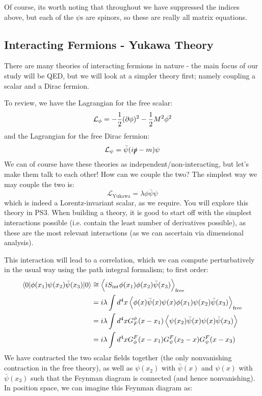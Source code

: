 Of course, its worth noting that throughout we have suppressed the indices above, but each of the $\psi$s are spinors, so these are really all matrix equations.

\subsection{Interacting Fermions - Yukawa Theory}
There are many theories of interacting fermions in nature - the main focus of our study will be QED, but we will look at a simpler theory first; namely coupling a scalar and a Dirac fermion.

To review, we have the Lagrangian for the free scalar:
\begin{equation}
    \mathcal{L}_\phi = -\frac{1}{2}(\partial\phi)^2 - \frac{1}{2}M^2\phi^2
\end{equation}
and the Lagrangian for the free Dirac fermion:
\begin{equation}
    \mathcal{L}_\psi = \bar{\psi}(i\slashed{p} - m)\psi
\end{equation}
We can of course have these theories as independent/non-interacting, but let's make them talk to each other! How can we couple the two? The simplest way we may couple the two is:
\begin{equation}
    \mathcal{L}_{\text{Yukawa}} = \lambda \phi \bar{\psi}\psi
\end{equation}
which is indeed a Lorentz-invariant scalar, as we require. You will explore this theory in PS3. When building a theory, it is good to start off with the simplest interactions possible (i.e. contain the least number of derivatives possible), as these are the most relevant interactions (as we can ascertain via dimensional analysis).

This interaction will lead to a correlation, which we can compute perturbatively in the usual way using the path integral formalism; to first order:
\begin{equation}
    \begin{split}
        \langle 0 \rvert\phi(x_1)\psi(x_2)\bar{\psi}(x_3)\lvert 0 \rangle &\cong \left< iS_{\text{int}}\phi(x_1)\phi(x_2)\bar{\psi}(x_3) \right>_{\text{free}}
        \\ &= i\lambda \int d^4x \left< \phi(x)\bar{\psi}(x)\psi(x) \phi(x_1)\psi(x_2)\bar{\psi}(x_3) \right>_{\text{free}}
        \\ &= i\lambda \int d^4x G_F^\phi(x - x_1)\left< \psi(x_2)\bar{\psi}(x)\psi(x)\bar{\psi}(x_3) \right>
        \\ &= i\lambda \int d^4x G_\phi^F(x - x_1)G_\psi^F(x_2 - x)G^F_\psi(x - x_3)
    \end{split}
\end{equation}
We have contracted the two scalar fields together (the only nonvanishing contraction in the free theory), as well as $\psi(x_2)$ with $\bar{\psi}(x)$ and $\psi(x)$ with $\bar{\psi}(x_3)$ such that the Feynman diagram is connected (and hence nonvanishing). In position space, we can imagine this Feynman diagram as:

